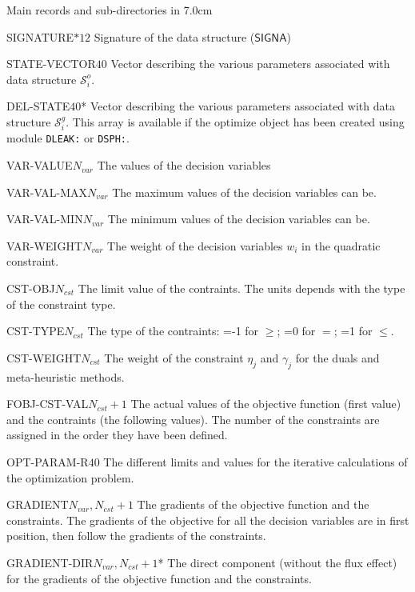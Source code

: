 \begin{DescriptionEnregistrement}{Main records and sub-directories in }{7.0cm}

\CharEnr
{SIGNATURE}{$*12$}
{Signature of the data structure ($\mathsf{SIGNA}$)}

\IntEnr
{STATE-VECTOR}{$40$}
{Vector describing the various parameters associated with data structure $\mathcal{S}^{o}_{i}$.}

\OptIntEnr
{DEL-STATE}{$40$}{*}
{Vector describing the various parameters associated with data structure $\mathcal{S}^{g}_{i}$. This array is
 available if the {\sc optimize} object has been created using module {\tt DLEAK:} or {\tt DSPH:}.}

\DbleEnr
{VAR-VALUE}{$N_{var}$}{}
{The values of the decision variables}

\DbleEnr
{VAR-VAL-MAX}{$N_{var}$}{}
{The maximum values of the decision variables can be.}

\DbleEnr
{VAR-VAL-MIN}{$N_{var}$}{}
{The minimum values of the decision variables can be.}

\DbleEnr
{VAR-WEIGHT}{$N_{var}$}{}
{The weight of the decision variables $w_{i}$ in the quadratic constraint.}

\DbleEnr
{CST-OBJ}{$N_{cst}$}{}
{The limit value of the contraints. The units depends with the type of the constraint type.}

\IntEnr
{CST-TYPE}{$N_{cst}$}
{The type of the contraints: =-1 for $\geq$; =0 for $=$; =1 for $\leq$.}

\DbleEnr
{CST-WEIGHT}{$N_{cst}$}{}
{The weight of the constraint $\eta_{j}$ and $\gamma_{j}$ for the duals and meta-heuristic methods.}

\DbleEnr
{FOBJ-CST-VAL}{$N_{cst}+1$}{}
{The actual values of the objective function (first value) and the contraints (the following values). The
number of the constraints are assigned in the order they have been defined.}

\DbleEnr
{OPT-PARAM-R}{$40$}{}
{The different limits and values for the iterative calculations of the optimization problem.}

\DbleEnr
{GRADIENT}{$N_{var}, N_{cst}+1$}{}
{The gradients of the objective function and the constraints. The gradients of the objective for all the
decision variables are in first position, then follow the gradients of the constraints.}

\OptDbleEnr
{GRADIENT-DIR}{$N_{var}, N_{cst}+1$}{*}{}
{The direct component (without the flux effect) for the gradients of the objective function and the constraints.}


\end{DescriptionEnregistrement}
